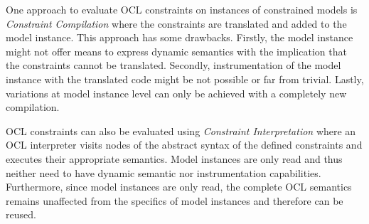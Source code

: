 	One approach to evaluate OCL constraints on instances 
	of constrained models is \textit{Constraint Compilation} where the constraints are 
	translated and added to the model instance. This approach has some drawbacks. 
	Firstly, the model instance might not offer means to express dynamic semantics with 
	the implication that the constraints cannot be translated. Secondly, 
	instrumentation of the model instance with the translated code might be not possible 
	or far from trivial. Lastly, variations at model instance level can only be achieved with 
	a completely new compilation.
	
	OCL constraints can also be evaluated using \textit{Constraint Interpretation} where 
	an OCL interpreter visits nodes of the abstract syntax of the defined constraints and 
	executes their appropriate semantics. Model instances are only read and thus neither 
	need to have dynamic semantic nor instrumentation capabilities. Furthermore, 
	since model instances are only read, the complete OCL semantics remains 
	unaffected from the specifics of model instances and therefore can be reused.
	

	
